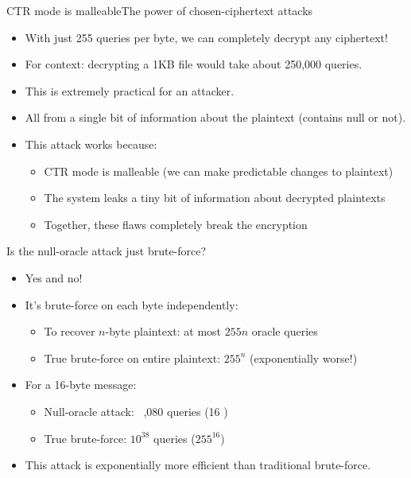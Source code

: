 \documentclass[aspectratio=169, lualatex, handout]{beamer}
\begin{document}
\begin{frame}{CTR mode is malleable}{The power of chosen-ciphertext attacks}
	\begin{itemize}
		\item With just 255 queries per byte, we can completely decrypt any ciphertext!
		\item For context: decrypting a 1KB file would take about 250,000 queries.
		\item This is extremely practical for an attacker.
		\item All from a single bit of information about the plaintext (contains null or not).
		\item This attack works because:
		      \begin{itemize}
			      \item CTR mode is malleable (we can make predictable changes to plaintext)
			      \item The system leaks a tiny bit of information about decrypted plaintexts
			      \item Together, these flaws completely break the encryption
		      \end{itemize}
	\end{itemize}
\end{frame}

\begin{frame}{Is the null-oracle attack just brute-force?}
	\begin{itemize}
		\item Yes and no!
		\item It's brute-force on each byte independently:
		      \begin{itemize}
			      \item To recover $n$-byte plaintext: at most $255n$ oracle queries
			      \item True brute-force on entire plaintext: $255^n$ (exponentially worse!)
		      \end{itemize}
		\item For a 16-byte message:
		      \begin{itemize}
			      \item Null-oracle attack: ~\approx,080 queries (16 )
			      \item True brute-force: \approx$10^{38}$ queries ($255^{16}$)
		      \end{itemize}
		\item This attack is exponentially more efficient than traditional brute-force.
	\end{itemize}
\end{frame}
\end{document}
